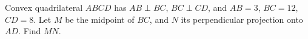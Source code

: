 Convex quadrilateral $ABCD$ has $AB\perp BC$, $BC\perp CD$, and $AB=3$, $BC=12$, $CD=8$. Let $M$ be the midpoint of $BC$, and $N$ its perpendicular projection onto $AD$. Find $MN$.
